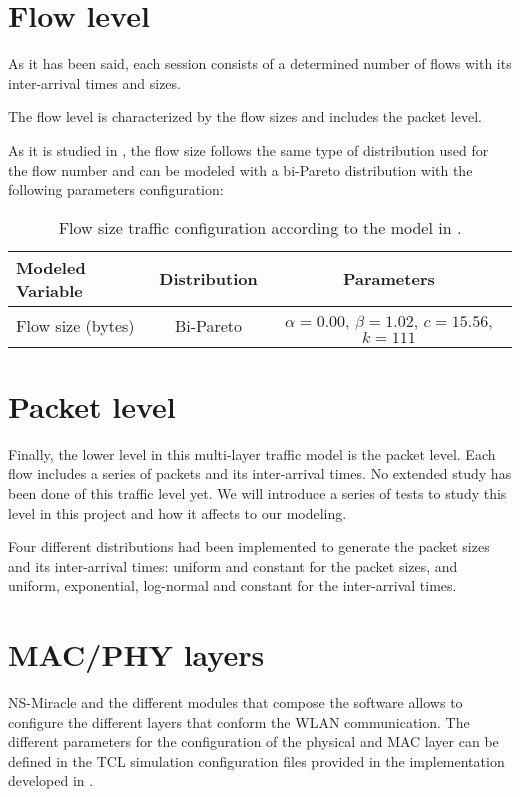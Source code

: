 \section{Flow level} \label{sec:flow_level}
As it has been said, each session consists of a determined number of flows with its inter-arrival times and sizes.

The flow level is characterized by the flow sizes and includes the packet level.

As it is studied in \cite{Campus-WLAN}, the flow size follows the same type of distribution used for the flow number and can be modeled with a bi-Pareto distribution with the following parameters configuration:

\begin{table}[h!]
	\begin{center}
		\begin{tabular}{ l | c | c }
			Modeled Variable & Distribution & Parameters \\ \hline
			Flow size (bytes) & Bi-Pareto & $\alpha = 0.00$, $\beta = 1.02$, $c = 15.56$, $k = 111$\\
		\end{tabular}
		\caption{Flow size traffic configuration according to the model in \cite{Campus-WLAN}.}
		\label{table:flow_traffic}
	\end{center}
\end{table}

\section{Packet level} \label{sec:packet_level}
Finally, the lower level in this multi-layer traffic model is the packet level. Each flow includes a series of packets and its inter-arrival times. No extended study has been done of this traffic level yet. We will introduce a series of tests to study this level in this project and how it affects to our modeling.

Four different distributions had been implemented to generate the packet sizes and its inter-arrival times: uniform and constant for the packet sizes, and uniform, exponential, log-normal and constant for the inter-arrival times.

\section{MAC/PHY layers} \label{sec:mac-phy_level}
NS-Miracle and the different modules that compose the software allows to configure the different layers that conform the \acs{WLAN} communication. The different parameters for the configuration of the physical and MAC layer can be defined in the TCL simulation configuration files provided in the implementation developed in \cite{marcello-thesis}.

